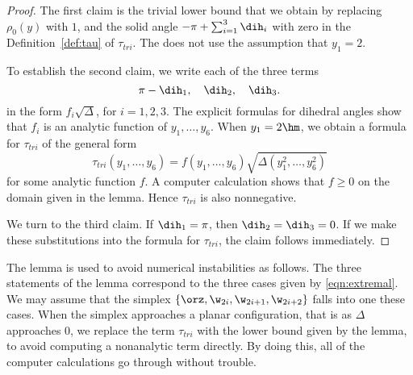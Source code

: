 \begin{proof}
The first claim is the trivial lower bound that we obtain by replacing
$\rho_0(y)$
with $1$, and the solid angle $-\pi+\sum_{i=1}^3 \dih_i$ with zero
in the Definition~\ref{def:tau} of $\tau_{tri}$.  The does not use the
assumption that $y_1=2$.

To establish the second claim, we write each of the three terms 
\[
\pi-\dih_1,\quad\dih_2,\quad \dih_3.
\]
in the form $f_i\sqrt{\Delta}$, for $i=1,2,3$.  The explicit formulas
for dihedral angles show that $f_i$ is an analytic function of
$y_1,\ldots,y_6$.  When $y_1=2\hm$, we obtain a formula for
$\tau_{tri}$ of the general form
\[
\tau_{tri}(y_1,\ldots,y_6)= f(y_1,\ldots,y_6)\sqrt{\Delta(y_1^2,\ldots,y_6^2)}
\]
for some analytic function $f$.  A computer calculation shows that $f\ge0$
on the domain given in the lemma. Hence $\tau_{tri}$ is also nonnegative.

We turn to the third claim.  If $\dih_1=\pi$, then $\dih_2=\dih_3=0$.
If we make these substitutions into the formula for $\tau_{tri}$, the
claim follows immediately.
\end{proof}

The lemma is used to avoid numerical instabilities as follows.  The
three statements of the lemma correspond to the three cases given by
\eqref{eqn:extremal}.  We may assume that the simplex
$\{\orz,\w_{2i},\w_{2i+1},\w_{2i+2}\}$ falls into one these cases.
When the simplex approaches a planar configuration, that is as
$\Delta$ approaches $0$, we replace the term $\tau_{tri}$ with the
lower bound given by the lemma, to avoid computing a nonanalytic
term directly.  By doing this, all of the computer calculations go
through without trouble.
